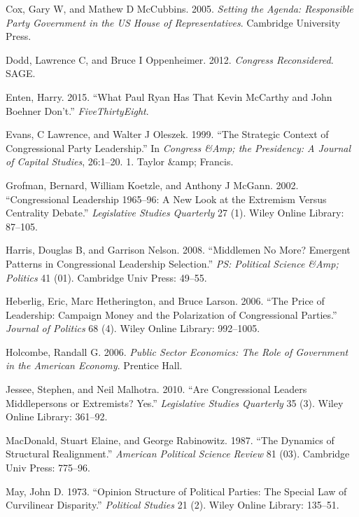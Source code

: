 \documentclass[12pt,twoside]{reedthesis}
\begin{document}
  \hypertarget{ref-Cox2005}{}
  Cox, Gary W, and Mathew D McCubbins. 2005. \emph{Setting the Agenda:
  Responsible Party Government in the US House of Representatives}.
  Cambridge University Press.
  
  \hypertarget{ref-Dodd2012}{}
  Dodd, Lawrence C, and Bruce I Oppenheimer. 2012. \emph{Congress
  Reconsidered}. SAGE.
  
  \hypertarget{ref-Enten2015}{}
  Enten, Harry. 2015. ``What Paul Ryan Has That Kevin McCarthy and John
  Boehner Don't.'' \emph{FiveThirtyEight}.
  
  \hypertarget{ref-Evans1999}{}
  Evans, C Lawrence, and Walter J Oleszek. 1999. ``The Strategic Context
  of Congressional Party Leadership.'' In \emph{Congress \&Amp; the
  Presidency: A Journal of Capital Studies}, 26:1--20. 1. Taylor \&amp;
  Francis.
  
  \hypertarget{ref-Grofman2002}{}
  Grofman, Bernard, William Koetzle, and Anthony J McGann. 2002.
  ``Congressional Leadership 1965--96: A New Look at the Extremism Versus
  Centrality Debate.'' \emph{Legislative Studies Quarterly} 27 (1). Wiley
  Online Library: 87--105.
  
  \hypertarget{ref-Harris2008}{}
  Harris, Douglas B, and Garrison Nelson. 2008. ``Middlemen No More?
  Emergent Patterns in Congressional Leadership Selection.'' \emph{PS:
  Political Science \&Amp; Politics} 41 (01). Cambridge Univ Press:
  49--55.
  
  \hypertarget{ref-Heberlig2006}{}
  Heberlig, Eric, Marc Hetherington, and Bruce Larson. 2006. ``The Price
  of Leadership: Campaign Money and the Polarization of Congressional
  Parties.'' \emph{Journal of Politics} 68 (4). Wiley Online Library:
  992--1005.
  
  \hypertarget{ref-Holcombe2006}{}
  Holcombe, Randall G. 2006. \emph{Public Sector Economics: The Role of
  Government in the American Economy}. Prentice Hall.
  
  \hypertarget{ref-Jessee2010}{}
  Jessee, Stephen, and Neil Malhotra. 2010. ``Are Congressional Leaders
  Middlepersons or Extremists? Yes.'' \emph{Legislative Studies Quarterly}
  35 (3). Wiley Online Library: 361--92.
  
  \hypertarget{ref-MacDonald1987}{}
  MacDonald, Stuart Elaine, and George Rabinowitz. 1987. ``The Dynamics of
  Structural Realignment.'' \emph{American Political Science Review} 81
  (03). Cambridge Univ Press: 775--96.
  
  \hypertarget{ref-May1973}{}
  May, John D. 1973. ``Opinion Structure of Political Parties: The Special
  Law of Curvilinear Disparity.'' \emph{Political Studies} 21 (2). Wiley
  Online Library: 135--51.
  
\end{document}
